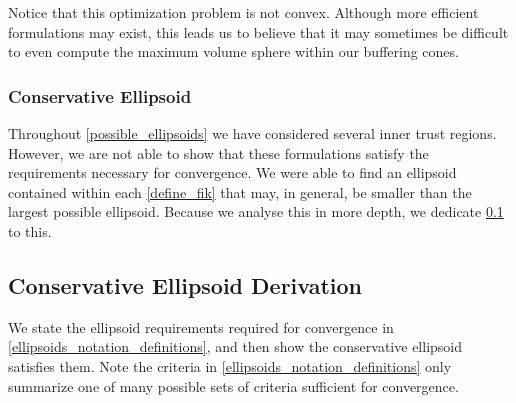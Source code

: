 \documentclass{article}
\theoremstyle{case}
\numberwithin{theorem}{subsection}
\begin{document}
Notice that this optimization problem is not convex.
Although more efficient formulations may exist, this leads us to believe that it may sometimes be difficult to even compute the maximum volume sphere within our buffering cones.

\subsubsection{Conservative Ellipsoid}
Throughout \cref{possible_ellipsoids} we have considered several inner trust regions.
However, we are not able to show that these formulations satisfy the requirements necessary for convergence.
We were able to find an ellipsoid contained within each \cref{define_fik} that may, in general, be smaller than the largest possible ellipsoid.
Because we analyse this in more depth, we dedicate \cref{constructing_and_analysizing_conservative_ellipsoid} to this.

\subsection{Conservative Ellipsoid Derivation}
\label{constructing_and_analysizing_conservative_ellipsoid}

We state the ellipsoid requirements required for convergence in \cref{ellipsoids_notation_definitions}, and then show the conservative ellipsoid satisfies them.
Note the criteria in \cref{ellipsoids_notation_definitions} only summarize one of many possible sets of criteria sufficient for convergence.
\end{document}
